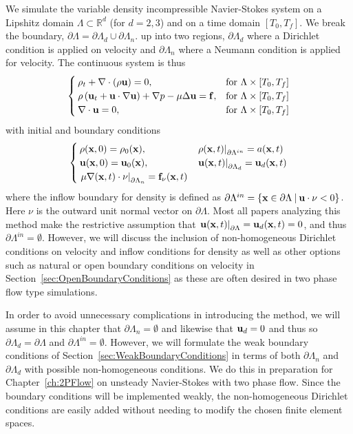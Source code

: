 \documentclass[letterpaper]{erdc}
\begin{document}
We simulate the variable density incompressible Navier-Stokes system on a
Lipshitz domain $\Lambda\subset \mathbb{R}^d$ (for $d=2,3$) and on a time
domain $[T_0,T_f]$.  We break the boundary,
$\partial\Lambda=\partial\Lambda_d\cup\partial\Lambda_n$. up into two regions,
$\partial\Lambda_d$ where a Dirichlet condition is applied on velocity and
$\partial\Lambda_n$ where a Neumann condition is applied for velocity.  The
continuous system is thus
\begin{equation}\label{eqn:variabledensityNavierStokes}
  \begin{cases}
    \rho_t + \nabla\cdot\left( \rho \textbf{u}\right) = 0, & \mbox{for }\Lambda\times[T_0,T_f]\\
    \rho\left(\textbf{u}_t + \textbf{u}\cdot\nabla\textbf{u}  \right) + \nabla p - \mu\Delta \textbf{u} = \mathbf{f}, &\mbox{for }\Lambda\times[T_0,T_f]\\
    \nabla\cdot \textbf{u} = 0, &\mbox{for } \Lambda\times[T_0,T_f]
  \end{cases}
\end{equation}
with initial and boundary conditions
\begin{equation}\label{eqn:variabledensityNavierStokesBCIC}
  \begin{cases}
    \rho(\textbf{x},0) = \rho_0(\textbf{x}), & \left.\rho(\textbf{x},t)\right|_{\partial\Lambda^{in}} = a(\textbf{x},t)\\
    \textbf{u}(\textbf{x},0) = \textbf{u}_0(\textbf{x}), & \left.\textbf{u}(\textbf{x},t)\right|_{\partial\Lambda_d} = \textbf{u}_d(\textbf{x},t)\\
    \left.\mu\nabla(\textbf{x},t)\cdot\nu\right|_{\partial\Lambda_n} = \mathbf{f}_{\nu}(\textbf{x},t) 
  \end{cases}
\end{equation}
where the inflow boundary for density is defined as
$\partial\Lambda^{in} = \{ \textbf{x}\in \partial\Lambda \:|\: \textbf{u}\cdot\nu <0 \}$.
Here $\nu$ is the outward unit normal vector on $\partial\Lambda$.  Most all
papers analyzing this method make the restrictive assumption that
$\left.\textbf{u}(\textbf{x},t)\right|_{\partial\Lambda} = \textbf{u}_d(\textbf{x},t) = 0$, and thus
$\partial\Lambda^{in}= \emptyset$.  However, we will discuss the inclusion of
non-homogeneous Dirichlet conditions on velocity and inflow conditions for
density as well as other options such as natural or open boundary conditions on
velocity in Section~\ref{sec:OpenBoundaryConditions} as these are often desired
in two phase flow type simulations.


In order to avoid unnecessary complications in introducing the method, we will
assume in this chapter that $\partial\Lambda_n=\emptyset$ and likewise that
$\textbf{u}_d = 0$ and thus so $\partial\Lambda_d=\partial\Lambda$ and
$\partial\Lambda^{in}=\emptyset$.  However, we will formulate the weak boundary
conditions of Section~\ref{sec:WeakBoundaryConditions} in terms of both
$\partial\Lambda_n$ and $\partial\Lambda_d$ with possible non-homogeneous
conditions.  We do this in preparation for Chapter~\ref{ch:2PFlow} on unsteady
Navier-Stokes with two phase flow.  Since the boundary conditions will be
implemented weakly, the non-homogeneous Dirichlet conditions are easily added
without needing to modify the chosen finite element spaces.
\end{document}
